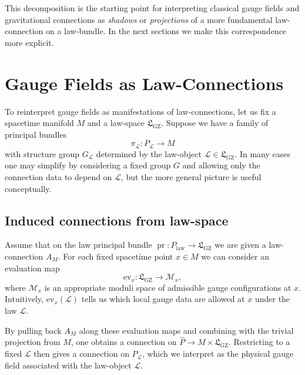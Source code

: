 \documentclass[11pt]{book}
\newcommand{\GZLS}{\ensuremath{\mathfrak{L}_{\mathrm{GZ}}}}
\newcommand{\GZLOC}{\ensuremath{A_M}}
\newcommand{\Base}{\ensuremath{M}}
\newcommand{\Bundle}{\ensuremath{P}}
\newcommand{\pr}{\operatorname{pr}}
\newcommand{\Group}{\ensuremath{G}}
\theoremstyle{plain}
\theoremstyle{definition}
\theoremstyle{remark}
\begin{document}
This decomposition is the starting point for interpreting classical
gauge fields and gravitational connections as \emph{shadows} or
\emph{projections} of a more fundamental law-connection on a
law-bundle. In the next sections we make this correspondence more
explicit.

\section{Gauge Fields as Law-Connections}
\label{sec:gauge-as-law-conn}



To reinterpret gauge fields as manifestations of law-connections, let
us fix a spacetime manifold $\Base$ and a law-space $\GZLS$. Suppose
we have a family of principal bundles
\[
   \pi_{\mathcal{L}} \colon \Bundle_{\mathcal{L}} \to \Base
\]
with structure group $\Group_{\mathcal{L}}$ determined by the
law-object $\mathcal{L} \in \GZLS$. In many cases one may simplify by
considering a fixed group $\Group$ and allowing only the connection
data to depend on $\mathcal{L}$, but the more general picture is
useful conceptually.

\subsection{Induced connections from law-space}

Assume that on the law principal bundle
$\pr \colon \Bundle_{\mathrm{law}} \to \GZLS$ we are given a
law-connection $\GZLOC$. For each fixed spacetime point
$x \in \Base$ we can consider an evaluation map
\[
   \mathrm{ev}_x \colon \GZLS \longrightarrow \mathcal{M}_x,
\]
where $\mathcal{M}_x$ is an appropriate moduli space of admissible
gauge configurations at $x$. Intuitively, $\mathrm{ev}_x(\mathcal{L})$
tells us which local gauge data are allowed at $x$ under the law
$\mathcal{L}$.

By pulling back $\GZLOC$ along these evaluation maps and combining
with the trivial projection from $\Base$, one obtains a connection on
$\widehat{\Bundle} \to \Base \times \GZLS$. Restricting to a fixed
$\mathcal{L}$ then gives a connection on $\Bundle_{\mathcal{L}}$,
which we interpret as the physical gauge field associated with the
law-object $\mathcal{L}$.
\end{document}
